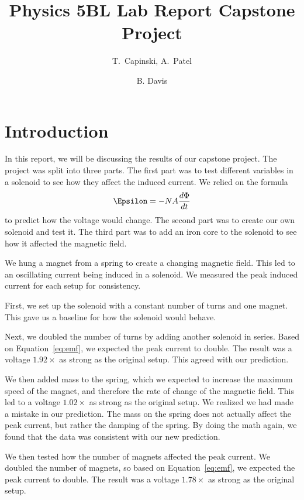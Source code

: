 \documentclass[11pt]{article}
\title{Physics 5BL Lab Report Capstone Project}
\author{T.~Capinski, A.~Patel \and B. Davis}
\let\oldsection\section
\renewcommand\section{\clearpage\oldsection}
\begin{document}
    \maketitle
    \tableofcontents

    \section*{Introduction}\label{sec:introduction}

    In this report, we will be discussing the results of our capstone project.
    The project was split into three parts.
    The first part was to test different variables in a solenoid to see how they affect the induced current.
    We relied on the formula
    \begin{equation}
        \Epsilon = -N A \frac{d\Phi}{dt}
        \label{eq:emf}
    \end{equation}
    to predict how the voltage would change.
    The second part was to create our own solenoid and test it.
    The third part was to add an iron core to the solenoid to see how it affected the magnetic field.

    We hung a magnet from a spring to create a changing magnetic field.
    This led to an oscillating current being induced in a solenoid.
    We measured the peak induced current for each setup for consistency.

    First, we set up the solenoid with a constant number of turns and one magnet.
    This gave us a baseline for how the solenoid would behave.

    Next, we doubled the number of turns by adding another solenoid in series.
    Based on Equation~\ref{eq:emf}, we expected the peak current to double.
    The result was a voltage $1.92 \times$ as strong as the original setup.
    This agreed with our prediction.

    We then added mass to the spring, which we expected to increase the maximum speed of the magnet, and therefore the rate of change of the magnetic field.
    This led to a voltage $1.02 \times$ as strong as the original setup.
    We realized we had made a mistake in our prediction.
    The mass on the spring does not actually affect the peak current, but rather the damping of the spring.
    By doing the math again, we found that the data was consistent with our new prediction.

    We then tested how the number of magnets affected the peak current.
    We doubled the number of magnets, so based on Equation~\ref{eq:emf}, we expected the peak current to double.
    The result was a voltage $1.78 \times$ as strong as the original setup.
\end{document}
